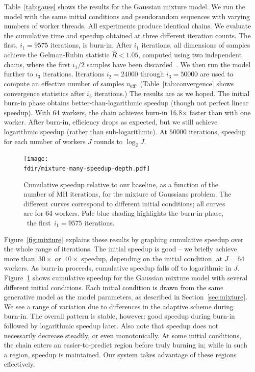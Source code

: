 \documentclass[angelino.tex]{subfiles}
\newcommand{\fdir}{figs/mixture-thesis}
\begin{document}
Table~\ref{tab:gauss} shows the results for the Gaussian mixture model.
%
We run the model with the same initial conditions and pseudorandom sequences with varying numbers of worker threads. All experiments produce identical chains.
%
We evaluate the cumulative time and speedup obtained at three different iteration counts.
%
The first, ${i_1 = 9575}$ iterations, is burn-in. After $i_1$ iterations, all dimensions of samples achieve the Gelman-Rubin statistic ${\hat R < 1.05}$, computed using two independent chains, where the first $i_1/2$ samples have been discarded~\citep{gelman:1992-inference}.
%
We then run the model further to $i_3$ iterations. Iterations ${i_2 = 24000}$ through ${i_3 = 50000}$ are used to compute an effective number of samples $n_\text{eff}$. (Table~\ref{tab:convergence} shows convergence statistics after $i_3$ iterations.)
%
The results are as we hoped. The initial burn-in phase obtains better-than-logarithmic speedup (though not perfect linear speedup).  With 64 workers, the chain achieves burn-in 16.8$\times$ faster than with one worker.
%
After burn-in, efficiency drops as expected, but we still achieve logarithmic speedup (rather than sub-logarithmic). At $50000$ iterations, speedup for each number of workers $J$ rounds to $\log_2 J$.



\begin{figure}[t!]
\begin{center}
\texttt{[image: \\fdir/mixture-many-speedup-depth.pdf]}
\end{center}
\caption{Cumulative speedup relative to our baseline,
as a function of the number of MH iterations, for the mixture of Gaussians problem.
The different curves correspond to different initial conditions;
all curves are for 64 workers.
Pale blue shading highlights the burn-in phase, \ie~the first~${i_1 = 9575}$ iterations.}
\label{fig:initcond}
\end{figure}

Figure~\ref{fig:mixture} explains these results by graphing cumulative speedup over the whole range of iterations.
%
The initial speedup is good -- we briefly achieve more than~$30\times$ or~$40\times$ speedup, depending on the initial condition, at ${J = 64}$ workers.
%
As burn-in proceeds, cumulative speedup falls off to logarithmic in $J$.
%
Figure~\ref{fig:initcond} shows cumulative speedup for the Gaussian mixture model with several different initial conditions.
%
Each initial condition is drawn from the same generative model as the model parameters, as described in Section~\ref{sec:mixture}.
%
We see a range of variation due to differences in the adaptive scheme during burn-in.
%
The overall pattern is stable, however: good speedup during burn-in followed by logarithmic speedup later.
%
Also note that speedup does not necessarily decrease steadily, or even monotonically. At some initial conditions, the chain enters an easier-to-predict region before truly burning in; while in such a region, speedup is maintained. Our system takes advantage of these regions effectively.
\end{document}
